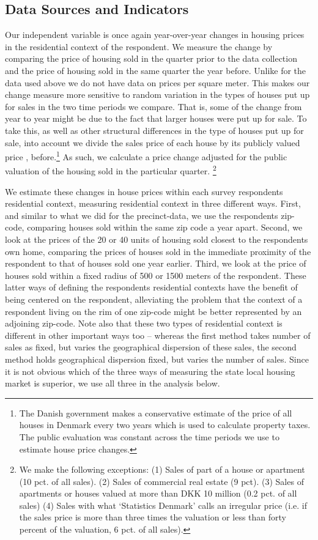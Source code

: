 \documentclass[12pt,a4paper]{article}
\begin{document}
\subsection{Data Sources and Indicators}
Our independent variable is once again year-over-year changes in housing prices in the residential context of the respondent. We measure the change by comparing the price of housing sold in the quarter prior to the data collection and the price of housing sold in the same quarter the year before. Unlike for the data used above we do not have data on prices per square meter. This makes our change measure more sensitive to random variation in the types of houses put up for sales in the two time periods we compare. That is, some of the change from year to year might be due to the fact that larger houses were put up for sale. To take this, as well as other structural differences in the type of houses put up for sale, into account we divide the sales price of each house by its publicly valued price , before.\footnote{The Danish government makes a conservative estimate of the price of all houses in Denmark every two years which is used to calculate property taxes. The public evaluation was constant across the time periods we use to estimate house price changes.} As such, we calculate a price change adjusted for the public valuation of the housing sold in the particular quarter. \footnote{We make the following exceptions: (1) Sales of part of a house or apartment (10 pct. of all sales). (2) Sales of commercial real estate (9 pct). (3) Sales of apartments or houses valued at more than DKK 10 million (0.2 pct. of all sales)  (4) Sales with what `Statistics Denmark' calls an irregular price (i.e. if the sales price is more than three times the valuation or less than forty percent of the valuation, 6 pct. of all sales).} 

We estimate these changes in house prices within each survey respondents residential context, measuring residential context  in three different ways. First, and similar to what we did for the precinct-data, we use the respondents zip-code, comparing houses sold within the same zip code a year apart. Second, we look at the prices of the 20 or 40 units of housing sold closest to the respondents own home, comparing the prices of houses sold in the immediate proximity of the respondent to that of houses sold one year earlier. Third, we look at the price of houses sold within a fixed radius of 500 or 1500 meters of the respondent. These latter ways of defining the respondents residential contexts have the benefit of being centered on the respondent, alleviating the problem that the context of a respondent living on the rim of one zip-code might be better represented by an adjoining zip-code. Note also that these two types of residential context is different in other important ways too -- whereas the first method takes number of sales as fixed, but varies the geographical dispersion of these sales, the second method holds geographical dispersion fixed, but varies the number of sales. Since it is not obvious which of the three ways of measuring the state local housing market is superior, we use all three in the analysis below.
\end{document}
